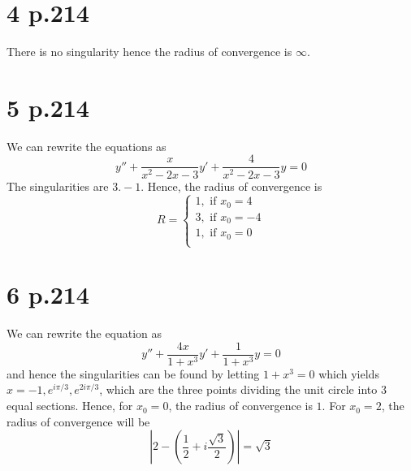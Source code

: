 \documentclass[11pt]{article}
\begin{document}
\section*{4 p.214}
There is no singularity hence the radius of convergence is $\infty$.
\newpage
\section*{5 p.214}
We can rewrite the equations as 
\[
    y'' + \frac{x}{x^2-2x-3}y' + \frac{4}{x^2-2x-3}y = 0     
\]
The singularities are $3.-1$. Hence, the radius of convergence is 
\[
    R = 
    \begin{cases}
        1, \text{ if } x_0 = 4 \\
        3, \text{ if } x_0 = -4 \\
        1, \text{ if } x_0 = 0 \\
    \end{cases}    
\]
\section*{6 p.214}
We can rewrite the equation as 
\[
    y'' + \frac{4x}{1+x^3}y' + \frac{1}{1+x^3} y = 0   
\]
and hence the singularities can be found by letting $1+x^3=0$ which yields $x = -1, e^{i\pi/3}, e^{2i\pi/3}$, which are the three points dividing the unit circle into 3 equal sections. Hence, for $x_0=0$, the radius of convergence is $1$.
For $x_0 = 2$, the radius of convergence will be 
\[
    \left| 2 - \left(\frac{1}{2} + i\frac{\sqrt{3}}{2}\right)\right| = \sqrt{3}   
\] 
\end{document}
